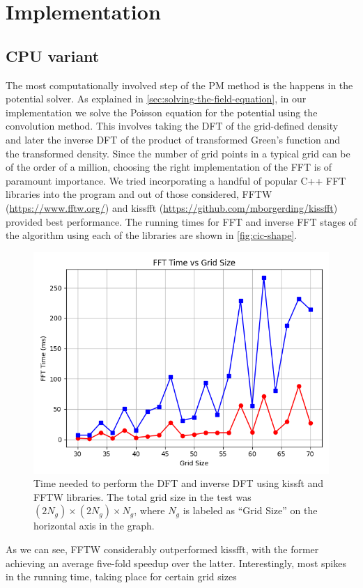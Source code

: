 \section{Implementation}
\subsection{CPU variant}
The most computationally involved step of the PM method is the happens in the potential solver.
As explained in \autoref{sec:solving-the-field-equation}, in our implementation we solve the Poisson equation for the potential using the convolution method.
This involves taking the DFT of the grid-defined density and later the inverse DFT of the product of transformed Green's function and the transformed density.
Since the number of grid points in a typical grid can be of the order of a million, choosing the right implementation of the FFT is of paramount importance.
We tried incorporating a handful of popular C++ FFT libraries into the program and out of those considered, FFTW (\url{https://www.fftw.org/}) and kissfft (\url{https://github.com/mborgerding/kissfft}) provided best performance.
The running times for FFT and inverse FFT stages of the algorithm using each of the libraries are shown in \autoref{fig:cic-shape}.
\begin{figure}[htp]
    \centering
    \includegraphics[scale=0.5]{chapters/pm-method/img/fft_time.png}
    \caption{Time needed to perform the DFT and inverse DFT using kissft and FFTW libraries.
        The total grid size in the test was $(2N_g)\times (2N_g) \times N_g$, where $N_g$ is labeled as ``Grid Size'' on the horizontal axis in the graph.}
    \label{fig:fft-time}
\end{figure}
As we can see, FFTW considerably outperformed kissfft, with the former achieving an average five-fold speedup over the latter.
Interestingly, most spikes in the running time, taking place for certain grid sizes

